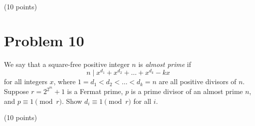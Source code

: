 \documentclass{article}
\begin{document}
(10 points)

\section*{Problem 10}
We say that a square-free positive integer $n$ is \emph{almost prime} if
\[
n \mid x^{d_1} + x^{d_2} + \ldots + x^{d_k} - kx
\]
for all integers $x$, where $1 = d_1 < d_2 < \ldots < d_k = n$ are all positive divisors of $n$. Suppose $r = 2^{2^m}+1$ is a Fermat prime, $p$ is a prime divisor of an almost prime $n$, and $p \equiv 1 \pmod{r}$. Show $d_i \equiv 1 \pmod{r}$ for all $i$.

(10 points)
\end{document}
